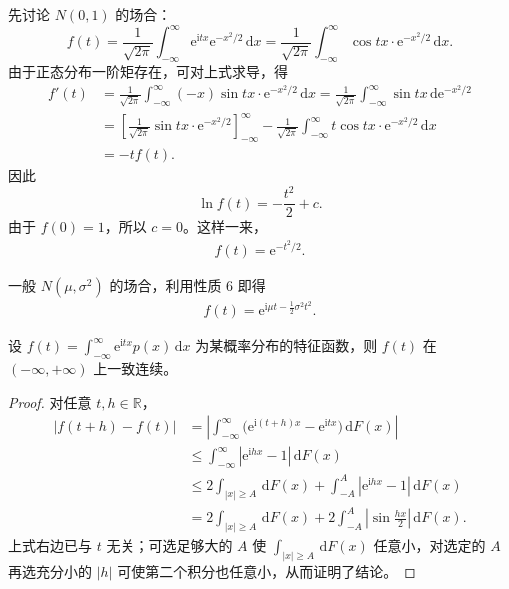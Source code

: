 \documentclass[../../main.tex]{subfiles}
\begin{document}
\begin{example}[正态分布的特征函数]\label{example:ch04-正态特征函数}
先讨论 $N(0,1)$ 的场合：
\[
f(t)=\frac{1}{\sqrt{2\pi}}\int_{-\infty}^{\infty}\mathrm{e}^{\mathrm{i}tx}\mathrm{e}^{-x^2/2}\,\mathrm{d}x
=\frac{1}{\sqrt{2\pi}}\int_{-\infty}^{\infty}\cos tx\cdot\mathrm{e}^{-x^2/2}\,\mathrm{d}x.
\]
由于正态分布一阶矩存在，可对上式求导，得
\begin{align*}
f'(t)&=\frac{1}{\sqrt{2\pi}}\int_{-\infty}^{\infty}(-x)\sin tx\cdot\mathrm{e}^{-x^2/2}\,\mathrm{d}x
=\frac{1}{\sqrt{2\pi}}\int_{-\infty}^{\infty}\sin tx\,\mathrm{d}\mathrm{e}^{-x^2/2}\\
&=\left[\frac{1}{\sqrt{2\pi}}\sin tx\cdot\mathrm{e}^{-x^2/2}\right]_{-\infty}^{\infty}
-\frac{1}{\sqrt{2\pi}}\int_{-\infty}^{\infty}t\cos tx\cdot\mathrm{e}^{-x^2/2}\,\mathrm{d}x\\
&=-tf(t).
\end{align*}
因此
\[
\ln f(t)=-\frac{t^2}{2}+c.
\]
由于 $f(0)=1$，所以 $c=0$。这样一来，
\begin{align}
f(t)=\mathrm{e}^{-t^2/2}.\label{align:ch04-标准正态特征函数}
\end{align}

一般 $N(\mu,\sigma^2)$ 的场合，利用性质 6 即得
\begin{align}
f(t)=\mathrm{e}^{\mathrm{i}\mu t-\frac12\sigma^2 t^2}.\label{align:ch04-一般正态特征函数}
\end{align}
\end{example}

\begin{theorem}\label{theorem:ch04-特征函数一致连续}
设 $f(t)=\int_{-\infty}^{\infty}\mathrm{e}^{\mathrm{i}tx}p(x)\,\mathrm{d}x$ 为某概率分布的特征函数，则 $f(t)$ 在 $(-\infty,+\infty)$ 上一致连续。
\end{theorem}

\begin{proof}
对任意 $t,h\in\mathbb{R}$，
\begin{align*}
|f(t+h)-f(t)|
&=\left|\int_{-\infty}^{\infty}\bigl(\mathrm{e}^{\mathrm{i}(t+h)x}-\mathrm{e}^{\mathrm{i}tx}\bigr)\,\mathrm{d}F(x)\right|\\
&\leqslant\int_{-\infty}^{\infty}|\mathrm{e}^{\mathrm{i}hx}-1|\,\mathrm{d}F(x)\\
&\leqslant 2\int_{|x|\geqslant A}\,\mathrm{d}F(x)+\int_{-A}^{A}|\mathrm{e}^{\mathrm{i}hx}-1|\,\mathrm{d}F(x)\\
&=2\int_{|x|\geqslant A}\,\mathrm{d}F(x)+2\int_{-A}^{A}\left|\sin\frac{hx}{2}\right|\,\mathrm{d}F(x).
\end{align*}
上式右边已与 $t$ 无关；可选足够大的 $A$ 使 $\int_{|x|\geqslant A}\,\mathrm{d}F(x)$ 任意小，对选定的 $A$ 再选充分小的 $|h|$ 可使第二个积分也任意小，从而证明了结论。
\end{proof}
\end{document}
